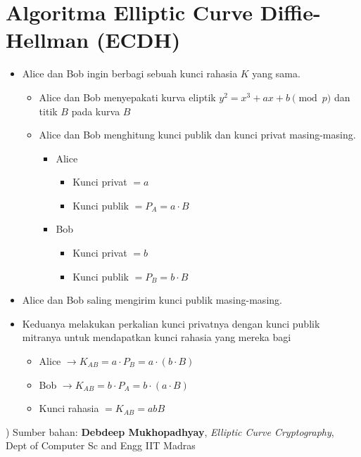 \documentclass{article}
\begin{document}

\section*{Algoritma Elliptic Curve Diffie-Hellman (ECDH)}

\begin{itemize}
    \item Alice dan Bob ingin berbagi sebuah kunci rahasia $K$ yang sama.
    \begin{itemize}
        \item Alice dan Bob menyepakati kurva eliptik $y^2 = x^3 + ax + b \pmod{p}$ dan titik $B$ pada kurva $B$
        \item Alice dan Bob menghitung kunci publik dan kunci privat masing-masing.
        \begin{itemize}
            \item Alice
            \begin{itemize}
                \item Kunci privat $= a$
                \item Kunci publik $= P_A = a \cdot B$
            \end{itemize}
            \item Bob
            \begin{itemize}
                \item Kunci privat $= b$
                \item Kunci publik $= P_B = b \cdot B$
            \end{itemize}
        \end{itemize}
    \end{itemize}
    \item Alice dan Bob saling mengirim kunci publik masing-masing.
    \item Keduanya melakukan perkalian kunci privatnya dengan kunci publik mitranya untuk mendapatkan kunci rahasia yang mereka bagi
    \begin{itemize}
        \item Alice $\rightarrow K_{AB} = a \cdot P_B = a \cdot (b \cdot B)$
        \item Bob $\rightarrow K_{AB} = b \cdot P_A = b \cdot (a \cdot B)$
        \item Kunci rahasia $= K_{AB} = abB$
    \end{itemize}
\end{itemize}

\vfill
\raggedleft
\small *) Sumber bahan: \textbf{Debdeep Mukhopadhyay}, \textit{Elliptic Curve Cryptography}, \\ Dept of Computer Sc and Engg IIT Madras
\end{document}
